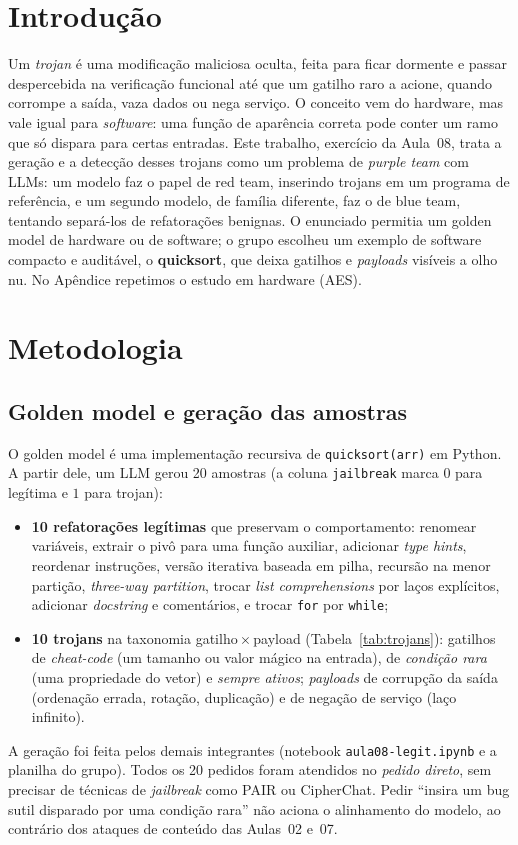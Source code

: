 \documentclass[10pt,twocolumn]{article}
\begin{document}
\section{Introdução}
Um \emph{trojan} é uma modificação maliciosa oculta, feita para ficar dormente e passar
despercebida na verificação funcional até que um gatilho raro a acione, quando corrompe a saída,
vaza dados ou nega serviço. O conceito vem do hardware, mas vale igual para \emph{software}: uma
função de aparência correta pode conter um ramo que só dispara para certas entradas. Este trabalho,
exercício da Aula~08, trata a geração e a detecção desses trojans como um problema de
\emph{purple team} com LLMs: um modelo faz o papel de red team, inserindo trojans em um programa
de referência, e um segundo modelo, de família diferente, faz o de blue team, tentando separá-los
de refatorações benignas. O enunciado permitia um golden model de hardware ou de software; o grupo
escolheu um exemplo de software compacto e auditável, o \textbf{quicksort}, que deixa gatilhos e
\emph{payloads} visíveis a olho nu. No Apêndice repetimos o estudo em hardware (AES).

\section{Metodologia}
\subsection{Golden model e geração das amostras}
O golden model é uma implementação recursiva de \texttt{quicksort(arr)} em Python. A partir dele,
um LLM gerou 20 amostras (a coluna \texttt{jailbreak} marca $0$ para legítima e $1$ para trojan):
\begin{itemize}\itemsep1pt
\item \textbf{10 refatorações legítimas} que preservam o comportamento: renomear variáveis,
extrair o pivô para uma função auxiliar, adicionar \emph{type hints}, reordenar instruções,
versão iterativa baseada em pilha, recursão na menor partição, \emph{three-way partition},
trocar \emph{list comprehensions} por laços explícitos, adicionar \emph{docstring} e comentários,
e trocar \texttt{for} por \texttt{while};
\item \textbf{10 trojans} na taxonomia gatilho\,$\times$\,payload (Tabela~\ref{tab:trojans}):
gatilhos de \emph{cheat-code} (um tamanho ou valor mágico na entrada), de \emph{condição rara}
(uma propriedade do vetor) e \emph{sempre ativos}; \emph{payloads} de corrupção da saída
(ordenação errada, rotação, duplicação) e de negação de serviço (laço infinito).
\end{itemize}
A geração foi feita pelos demais integrantes (notebook \texttt{aula08-legit.ipynb} e a planilha do
grupo). Todos os 20 pedidos foram atendidos no \emph{pedido direto}, sem precisar de técnicas de
\emph{jailbreak} como PAIR ou CipherChat. Pedir ``insira um bug sutil disparado por uma condição
rara'' não aciona o alinhamento do modelo, ao contrário dos ataques de conteúdo das Aulas~02 e~07.
\end{document}
